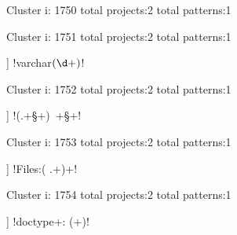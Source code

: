 Cluster i: 1750
total projects:2
total patterns:1
\begin{multicols}{1}
\begin{description}[noitemsep,topsep=0pt]
\item [[2] ] \cverb!^\[([^]]+)\](.*)$!
\end{description}
\end{multicols}







Cluster i: 1751
total projects:2
total patterns:1
\begin{multicols}{1}
\begin{description}[noitemsep,topsep=0pt]
\item [[2] ] \cverb!varchar\((\d+)\)!
\end{description}
\end{multicols}







Cluster i: 1752
total projects:2
total patterns:1
\begin{multicols}{1}
\begin{description}[noitemsep,topsep=0pt]
\item [[2] ] \cverb!\n(.+\S+)\ +\S+!
\end{description}
\end{multicols}







Cluster i: 1753
total projects:2
total patterns:1
\begin{multicols}{1}
\begin{description}[noitemsep,topsep=0pt]
\item [[2] ] \cverb!Files:\n(  .+\n)+!
\end{description}
\end{multicols}







Cluster i: 1754
total projects:2
total patterns:1
\begin{multicols}{1}
\begin{description}[noitemsep,topsep=0pt]
\item [[2] ] \cverb!doctype\s+: (\w+)!
\end{description}
\end{multicols}







